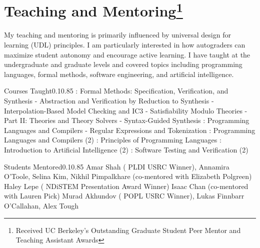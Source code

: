 \documentclass{federico_cv}
\begin{document}
\section{Teaching and Mentoring\protect\footnote{Received UC Berkeley's Outstanding Graduate Student Peer Mentor and Teaching Assistant Awards}}

My teaching and mentoring is primarily influenced by universal design for
learning (UDL) principles. I am particularly interested in how autograders can
maximize student autonomy and encourage active learning. I have taught at
the undergraduate and graduate levels and covered topics including programming
languages, formal methods, software engineering, and artificial intelligence.


\begin{tblSubSection}{Courses Taught}{0.1}{0.85}
{: Formal Methods: Specification, Verification, and Synthesis}
{\quad - Abstraction and Verification by Reduction to Synthesis} 
{\quad - Interpolation-Based Model Checking and IC3}
{\quad - Satisfiability Modulo Theories - Part II: Theories and Theory Solvers}
{\quad - Syntax-Guided Synthesis} 
{: Programming Languages and Compilers}
{\quad - Regular Expressions and Tokenization}
{: Programming Languages and Compilers (2)}
{: Principles of Programming Languages} 
{: Introduction to Artificial Intelligence (2)}
{: Software Testing and Verification (2)}
\end{tblSubSection}

\begin{tblSubSection}{Students Mentored}{0.1}{0.85}
{Amar Shah (
{PLDI  USRC Winner}), Annamira O'Toole, Selina Kim, Nikhil Pimpalkhare (co-mentored with Elizabeth Polgreen)}
{Haley Lepe
(
{NDiSTEM  Presentation Award Winner})}
{Isaac Chan (co-mentored with Lauren Pick)}
{Murad Akhundov
(
{POPL  USRC Winner}), Lukas Finnbarr O'Callahan, Alex Tough}
\end{tblSubSection}
\end{document}
